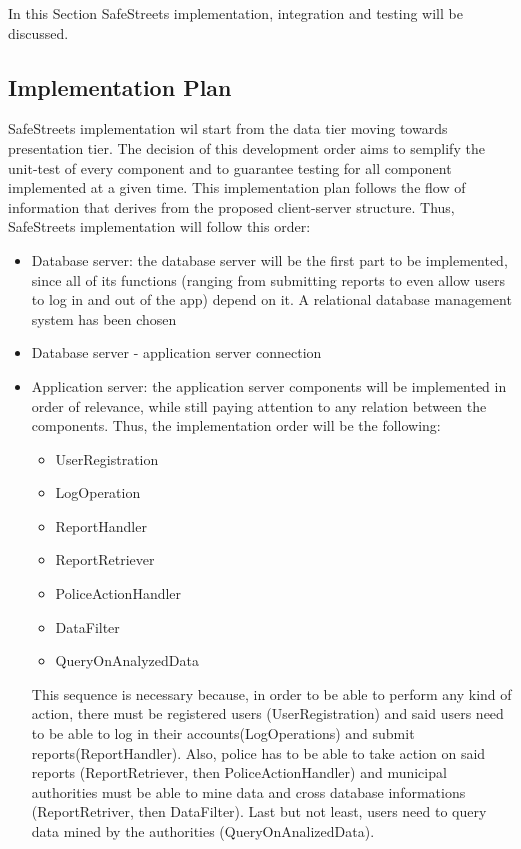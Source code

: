 In this Section SafeStreets implementation, integration and testing will be discussed.
\\

\subsection{Implementation Plan}
SafeStreets implementation wil start from the data tier moving towards presentation tier. The decision of this development order aims to semplify  the unit-test of every component and to guarantee testing for all component implemented at a given time. This implementation plan follows the flow of information that derives from the proposed client-server structure.\newline
Thus, SafeStreets implementation will follow this order:
\begin{itemize}
	\item Database server: the database server will be the first part to be implemented, since all of its functions (ranging from submitting reports to even allow users to log in and out of the app) depend on it. A relational database management system has been chosen
	\item Database server - application server connection
	\item Application server: the application server components will be implemented in order of relevance, while still paying attention to any relation between the components. Thus, the implementation order will be the following:
	\begin{itemize}
		\item UserRegistration
		\item LogOperation
		\item ReportHandler
		\item ReportRetriever
		\item PoliceActionHandler
		\item DataFilter
		\item QueryOnAnalyzedData
	\end{itemize}
	This sequence is necessary because, in order to be able to perform any kind of action, there must be registered users (UserRegistration) and said users need to be able to log in their accounts(LogOperations) and submit reports(ReportHandler). Also, police has to be able to take action on said reports (ReportRetriever, then PoliceActionHandler) and municipal authorities must be able to mine data and cross database informations (ReportRetriver, then DataFilter). Last but not least, users need to query data mined by the authorities (QueryOnAnalizedData).

\end{itemize}
